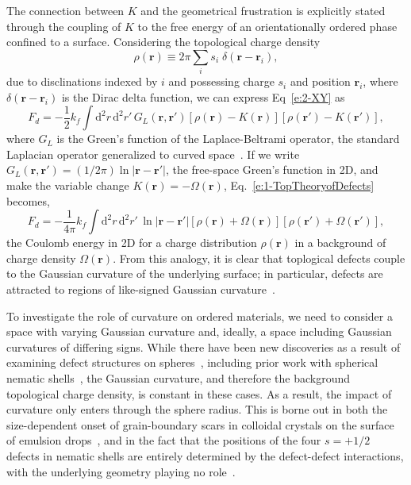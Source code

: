 The connection between $K$ and the geometrical frustration is explicitly stated through the coupling of $K$ to the free energy of an orientationally ordered phase confined to a surface.
Considering the topological charge density
\begin{equation}
  \rho(\mathbf{r}) \equiv 2 \pi \sum\limits_i s_{i} \; \delta(\mathbf{r} - \mathbf{r}_{i}),\label{e:1-ChargeDens}
\end{equation}
due to disclinations indexed by $i$ and possessing charge $s_{i}$ and position $\mathbf{r}_{i}$, where $\delta(\mathbf{r} - \mathbf{r}_{i})$ is the Dirac delta function, we can express Eq~\ref{e:2-XY} as~\cite{RN42,RN175,RN17}
\begin{equation}
  F_d = -\frac{1}{2} k_f \int \textrm{d}^2 r \, \textrm{d}^2 r' \, G_L(\mathbf{r},\mathbf{r}') [\rho(\mathbf{r})-K(\mathbf{r})] [\rho(\mathbf{r}')-K(\mathbf{r}')],\label{e:1-TopTheoryofDefects}
\end{equation}
where $G_L$ is the Green's function of the Laplace-Beltrami operator, the standard Laplacian operator generalized to curved space~\cite{RN17}.
If we write $G_L(\mathbf{r},\mathbf{r}') = (1/2\pi) \ln |\mathbf{r} - \mathbf{r}'|$, the free-space Green's function in 2D, and make the variable change $K(\mathbf{r}) = -\Omega(\mathbf{r})$, Eq.~\ref{e:1-TopTheoryofDefects} becomes,
\begin{equation}
  F_d = -\frac{1}{4 \pi} k_f \int \textrm{d}^2 r \, \textrm{d}^2 r' \, \ln |\mathbf{r} - \mathbf{r}'| [\rho(\mathbf{r})+\Omega(\mathbf{r})] [\rho(\mathbf{r}')+\Omega(\mathbf{r}')],
\end{equation}
the Coulomb energy in 2D for a charge distribution $\rho(\mathbf{r})$ in a background of charge density $\Omega(\mathbf{r})$.
From this analogy, it is clear that toplogical defects couple to the Gaussian curvature of the underlying surface; in particular, defects are attracted to regions of like-signed Gaussian curvature~\cite{RN17}.

To investigate the role of curvature on ordered materials, we need to consider a space with varying Gaussian curvature and, ideally, a space including Gaussian curvatures of differing signs.
While there have been new discoveries as a result of examining defect structures on spheres~\cite{RN106,RN26,RN110,RN76,RN101,RN165}, including prior work with spherical nematic shells~\cite{RN45,RN105}, the Gaussian curvature, and therefore the background topological charge density, is constant in these cases.
As a result, the impact of curvature only enters through the sphere radius.
This is borne out in both the size-dependent onset of grain-boundary scars in colloidal crystals on the surface of emulsion drops~\cite{RN26,RN110}, and in the fact that the positions of the four $s = +1/2$ defects in nematic shells are entirely determined by the defect-defect interactions, with the underlying geometry playing no role~\cite{RN45}.

